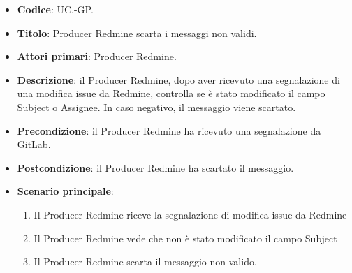 	\begin{itemize}
		\item \textbf{Codice}: UC\theuccount.\thesubuccount-GP.
		\item \textbf{Titolo}: Producer Redmine scarta i messaggi non validi.
		\item \textbf{Attori primari}: Producer Redmine.
		\item \textbf{Descrizione}: il Producer Redmine, dopo aver ricevuto una segnalazione di una modifica issue da Redmine, controlla
		se è stato modificato il campo Subject o Assignee. In caso negativo, il messaggio viene scartato.
		\item \textbf{Precondizione}: il Producer Redmine ha ricevuto una segnalazione da GitLab.
		\item \textbf{Postcondizione}: il Producer Redmine ha scartato il messaggio.
		\item \textbf{Scenario principale}: 
		\begin{enumerate}
			\item Il Producer Redmine riceve la segnalazione di modifica issue da Redmine
			\item Il Producer Redmine vede che non è stato modificato il campo Subject
			\item Il Producer Redmine scarta il messaggio non valido.
		\end{enumerate}
	\end{itemize}